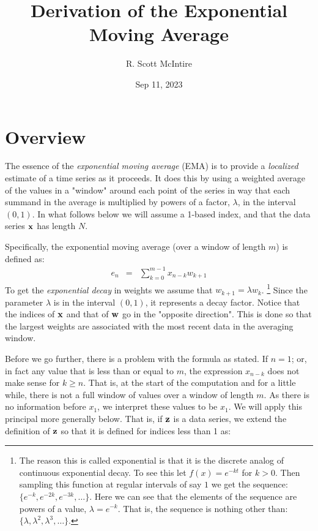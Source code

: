 \documentclass{article}
\title{Derivation of the Exponential Moving Average}
\author{R. Scott McIntire}
\date{Sep 11, 2023}
\begin{document}
\maketitle


\section{Overview}

The essence of the {\em exponential moving average\/} (EMA) is to provide 
a {\em localized\/} estimate of a time series as it proceeds. It does 
this by using a weighted average of the values in a "window" around each point 
of the series in way that each summand in 
the average is multiplied by powers of a factor, $\lambda$,
in the interval $(0,1)$.
In what follows below we will assume a 1-based index, and that 
the data series ${\bf x}$ has length $N$.

Specifically, the exponential moving average (over a window of length $m$) 
is defined as:
\begin{eqnarray}
    e_n &=& \sum_{k=0}^{m-1} x_{n-k} w_{k+1}  \label{ema_def}
\end{eqnarray}
To get the {\em exponential decay\/} in weights we assume that $w_{k+1} = \lambda w_k$.%
\footnote{The reason this is called exponential is that it is the discrete
analog of continuous exponential decay. To see this let $f(x) = e^{-kt}$ 
for $k > 0$. Then sampling this function at regular intervals of say $1$ 
we get the sequence: $\{ e^{-k}, e^{-2k}, e^{-3k}, \ldots \}$.
Here we can see that the elements of the sequence are powers of a value, $\lambda = e^{-k}$.
That is, the sequence is nothing other than: $\{\lambda, \lambda^2, \lambda^3, \ldots \}$.}
Since the parameter $\lambda$ is in the interval $(0,1)$, it represents a decay factor. 
Notice that the indices of ${\bf x}$ and that of ${\bf w}$ go in the "opposite direction".
This is done so that the largest weights are associated with the most recent data
in the averaging window.

Before we go further, there is a problem with the formula as stated.
If $n = 1$; or, in fact any value that is less than or equal to $m$,
the expression $x_{n-k}$ does not make sense for $k \ge n$. That is, at the 
start of the computation and for a little while, there is not a full window
of values over a window of length $m$. As there is no information before $x_1$,
we interpret these values to be $x_1$. 
We will apply this principal more generally below. 
That is, if ${\bf z}$ is a data series,
we extend the definition of ${\bf z}$ so that it is defined for
indices less than 1 as:
\end{document}
